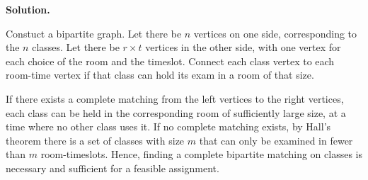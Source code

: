 \documentclass[11pt,letterpaper]{article}
\theoremstyle{definition}
\newcommand{\solution}{\medskip\noindent\textbf{Solution.}\par\medskip}
\begin{document}
\solution
Constuct a bipartite graph.
Let there be $n$ vertices on one side, corresponding to the $n$ classes.
Let there be $r\times t$ vertices in the other side, with one vertex for each choice of the room and the timeslot.
Connect each class vertex to each room-time vertex if that class can hold its exam in a room of that size.

If there exists a complete matching from the left vertices to the right vertices, each class can be held in the corresponding room of sufficiently large size, at a time where no other class uses it.
If no complete matching exists, by Hall's theorem there is a set of classes with size $m$ that can only be examined in fewer than $m$ room-timeslots.
Hence, finding a complete bipartite matching on classes is necessary and sufficient for a feasible assignment.
\end{document}
